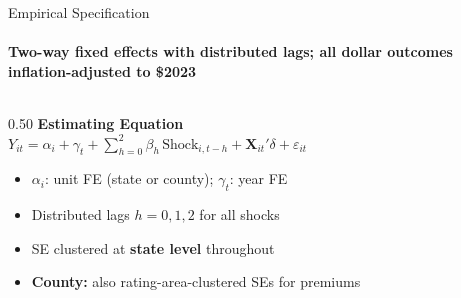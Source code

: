\documentclass[aspectratio=169,11pt]{beamer}
\newcommand{\emphcolor}[1]{{\color{WarmOrange}\textbf{#1}}}
\newcommand{\tealtext}[1]{{\color{Teal}#1}}
\begin{document}
\begin{frame}{Empirical Specification}
  \framesubtitle{Two-way fixed effects with distributed lags; all dollar outcomes inflation-adjusted to \$2023}
  \begin{columns}[T]
    \begin{column}{0.50\textwidth}
      \textbf{\tealtext{Estimating Equation}}\\[0.3em]
      \small
      \(Y_{it} = \alpha_i + \gamma_t + \sum_{h=0}^{2}\beta_h \, \text{Shock}_{i,t-h} + \mathbf{X}_{it}'\delta + \varepsilon_{it}\)
      \vspace{0.3em}

      \begin{itemize}\itemsep0.15em
        \item \(\alpha_i\): unit FE (state or county); \(\gamma_t\): year FE
        \item Distributed lags $h = 0, 1, 2$ for all shocks
        \item SE clustered at \emphcolor{state level} throughout
        \item \emphcolor{County:} also rating-area-clustered SEs for premiums
      \end{itemize}
      \vspace{0.3em}


\end{column}
\end{columns}
\end{frame}
\end{document}

